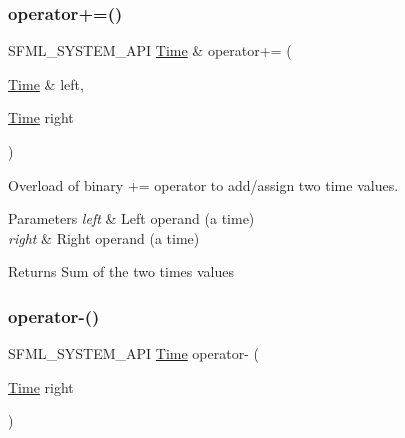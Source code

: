 \subsubsection{\texorpdfstring{operator+=()}{operator+=()}}
{\footnotesize\ttfamily S\+F\+M\+L\+\_\+\+S\+Y\+S\+T\+E\+M\+\_\+\+A\+PI \mbox{\hyperlink{classsf_1_1_time}{Time}} \& operator+= (\begin{DoxyParamCaption}\item[{\mbox{\hyperlink{classsf_1_1_time}{Time}} \&}]{left,  }\item[{\mbox{\hyperlink{classsf_1_1_time}{Time}}}]{right }\end{DoxyParamCaption})\hspace{0.3cm}{\ttfamily [related]}}



Overload of binary += operator to add/assign two time values. 


\begin{DoxyParams}{Parameters}
{\em left} & Left operand (a time) \\
\hline
{\em right} & Right operand (a time)\\
\hline
\end{DoxyParams}
\begin{DoxyReturn}{Returns}
Sum of the two times values \begin{DoxyVerb}\end{DoxyVerb}
 
\end{DoxyReturn}
\mbox{\label{classsf_1_1_time_a1b23b91cf367764338c2ff922c65da4e}} 
\subsubsection{\texorpdfstring{operator-\/()}{operator-()}\hspace{0.1cm}{\footnotesize\ttfamily [1/2]}}
{\footnotesize\ttfamily S\+F\+M\+L\+\_\+\+S\+Y\+S\+T\+E\+M\+\_\+\+A\+PI \mbox{\hyperlink{classsf_1_1_time}{Time}} operator-\/ (\begin{DoxyParamCaption}\item[{\mbox{\hyperlink{classsf_1_1_time}{Time}}}]{right }\end{DoxyParamCaption})\hspace{0.3cm}{\ttfamily [related]}}



